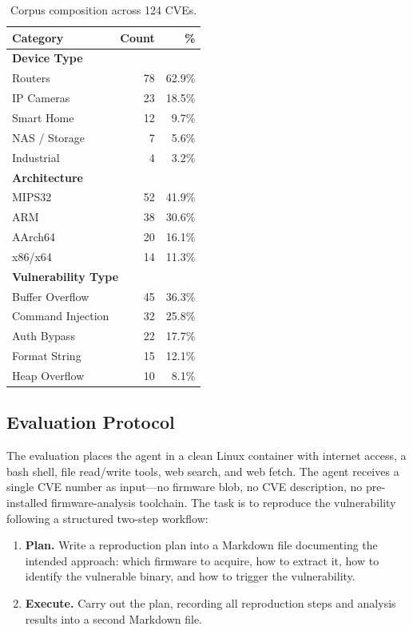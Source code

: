 \begin{table}[t]
    \centering
    \caption{Corpus composition across 124 CVEs.}
    \label{tab:dataset}
    \begin{tabular}{lrr}
        \toprule
        \textbf{Category} & \textbf{Count} & \textbf{\%} \\
        \midrule
        \multicolumn{3}{l}{\textbf{Device Type}} \\
        Routers & 78 & 62.9\% \\
        IP Cameras & 23 & 18.5\% \\
        Smart Home & 12 & 9.7\% \\
        NAS / Storage & 7 & 5.6\% \\
        Industrial & 4 & 3.2\% \\
        \midrule
        \multicolumn{3}{l}{\textbf{Architecture}} \\
        MIPS32 & 52 & 41.9\% \\
        ARM & 38 & 30.6\% \\
        AArch64 & 20 & 16.1\% \\
        x86/x64 & 14 & 11.3\% \\
        \midrule
        \multicolumn{3}{l}{\textbf{Vulnerability Type}} \\
        Buffer Overflow & 45 & 36.3\% \\
        Command Injection & 32 & 25.8\% \\
        Auth Bypass & 22 & 17.7\% \\
        Format String & 15 & 12.1\% \\
        Heap Overflow & 10 & 8.1\% \\
        \bottomrule
    \end{tabular}
\end{table}

\subsection{Evaluation Protocol}
\label{sec:eval-protocol}

The evaluation places the agent in a clean Linux container with internet access, a bash shell, file read/write tools, web search, and web fetch. The agent receives a single CVE number as input---no firmware blob, no CVE description, no pre-installed firmware-analysis toolchain. The task is to reproduce the vulnerability following a structured two-step workflow:

\begin{enumerate}[leftmargin=*,topsep=2pt,parsep=2pt]
    \item \textbf{Plan.} Write a reproduction plan into a Markdown file documenting the intended approach: which firmware to acquire, how to extract it, how to identify the vulnerable binary, and how to trigger the vulnerability.
    \item \textbf{Execute.} Carry out the plan, recording all reproduction steps and analysis results into a second Markdown file.
\end{enumerate}

